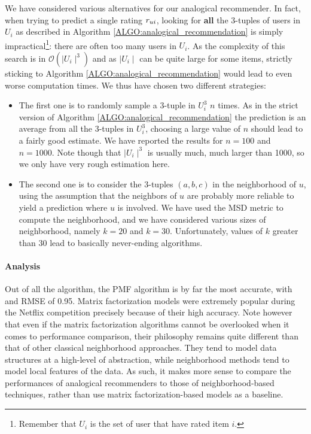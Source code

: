 We have considered various alternatives for our analogical
recommender. In fact, when trying to predict a single rating $r_{ui}$, looking
for \textbf{all} the $3$-tuples of users in $U_i$ as described in Algorithm
\ref{ALGO:analogical_recommendation} is simply impractical\footnote{Remember
that $U_i$ is the set of user that have rated item $i$.}: there are often too
many users in $U_i$. As the complexity of this search is in $\mathcal{O}(\mid
U_i\mid^3)$ and as $\mid U_i\mid$ can be quite large for some items, strictly
sticking to Algorithm \ref{ALGO:analogical_recommendation} would lead to
even worse computation times. We thus have chosen two different strategies:
\begin{itemize}
  \item The first one is to randomly sample a $3$-tuple in $U_i^3$ $n$ times.
    As in the strict version of Algorithm \ref{ALGO:analogical_recommendation}
    the prediction is an average from all the $3$-tuples in $U_i^3$, choosing a
    large value of $n$ should lead to a fairly good estimate. We have reported
    the results for $n = 100$ and $n = 1000$. Note though that $\mid U_i
    \mid^3$ is usually much, much larger than 1000, so we only have very rough
    estimation here.
  \item The second one is to consider the $3$-tuples $(a, b, c)$ in the
    neighborhood of $u$, using the assumption that the neighbors of $u$ are
    probably more reliable to yield a prediction where $u$ is involved. We have
    used the MSD metric to compute the neighborhood, and we have considered various
    sizes of neighborhood, namely $k = 20$  and $k = 30$. Unfortunately, values
    of $k$ greater than $30$ lead to basically never-ending algorithms.
\end{itemize}


\paragraph{Analysis\\}

Out of all the algorithm, the PMF algorithm is by far the most
accurate, with and RMSE of 0.95. Matrix factorization  models were extremely popular during the
Netflix competition precisely because of their high accuracy. Note however that
even if the matrix factorization algorithms cannot be overlooked when it comes
to performance comparison, their philosophy remains quite different than that
of other classical neighborhood approaches. They tend to model data structures
at a high-level of abstraction, while neighborhood methods tend to model local
features of the data. As such, it makes more sense to compare the performances
of analogical recommenders to those of neighborhood-based techniques, rather
than use matrix factorization-based models as a baseline.

